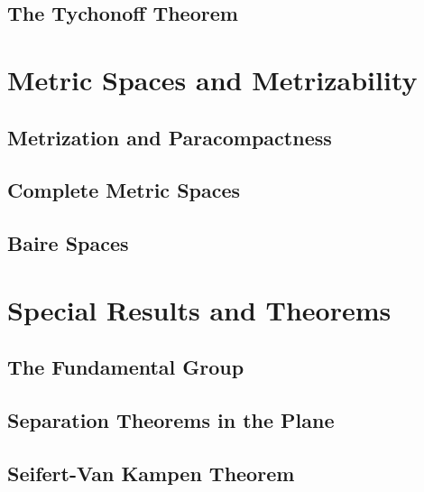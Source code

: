\documentclass[12pt, a4paper, oneside, openright, titlepage]{book}
\begin{document}


\chapter{ The Tychonoff Theorem}



\part{Metric Spaces and Metrizability}


\chapter{ Metrization and Paracompactness}


\chapter{ Complete Metric Spaces}


\chapter{ Baire Spaces}


\part{Special Results and Theorems}


\chapter{ The Fundamental Group}


\chapter{ Separation Theorems in the Plane}


\chapter{ Seifert-Van Kampen Theorem}
\end{document}
